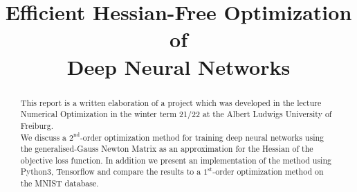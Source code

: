 \documentclass[conference]{IEEEtran}
\begin{document}
	
	\title{Efficient Hessian-Free Optimization of \\Deep Neural Networks}
	
	
	\author{
		\and
		\and
	}
	
	\maketitle
	\thispagestyle{plain}
	\pagestyle{plain}
	
	\begin{abstract}
		\noindent
		This report is a written elaboration of a project which was developed in the lecture Numerical Optimization in the winter term 21/22 at the Albert Ludwigs University of Freiburg.\\
		We discuss a $2^{\text{nd}}$-order optimization method for training deep neural networks using the generalised-Gauss Newton Matrix as an approximation for the Hessian of the objective loss function. In addition we present an implementation of the method using Python3, Tensorflow and compare the results to a $1^{\text{st}}$-order optimization method on the MNIST database.
	\end{abstract}
	
\end{document}
